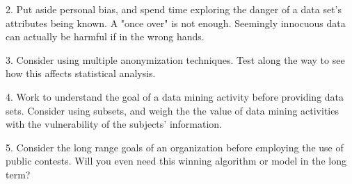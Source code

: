 \documentclass[10pt,journal,compsoc]{IEEEtran}
\begin{document}
2.  Put aside personal bias, and spend time exploring the danger of a data set's attributes being known.  A "once over" is not enough.  Seemingly innocuous data can actually be harmful if in the wrong hands.\linebreak

3.  Consider using multiple anonymization techniques.  Test along the way to see how this affects statistical analysis.\linebreak

4.  Work to understand the goal of a data mining activity before providing data sets. Consider using subsets, and weigh the the value of data mining activities with the vulnerability of the subjects' information.\linebreak

5.  Consider the long range goals of an organization before employing the use of public contests.  Will you even need this winning algorithm or model in the long term?



%
%

\end{document}
